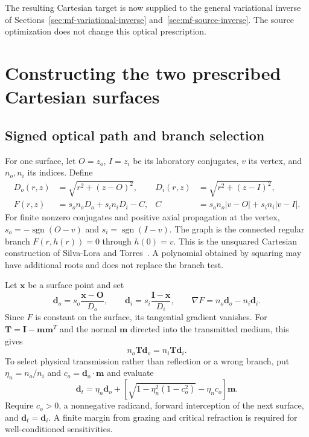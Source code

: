 The resulting Cartesian target is now supplied to the general variational
inverse of Sections~\ref{sec:mf-variational-inverse} and~\ref{sec:mf-source-inverse}.
The source optimization does not change this optical prescription.

\section{Constructing the two prescribed Cartesian surfaces}
\subsection{Signed optical path and branch selection}
For one surface, let $O=z_o$, $I=z_i$ be its laboratory conjugates, $v$ its
vertex, and $n_o,n_i$ its indices. Define
\begin{align}
 D_o(r,z)&=\sqrt{r^2+(z-O)^2},&D_i(r,z)&=\sqrt{r^2+(z-I)^2},\label{eq:distances}\\
 F(r,z)&=s_on_oD_o+s_in_iD_i-C,&
 C&=s_on_o|v-O|+s_in_i|v-I|.\label{eq:oval}
\end{align}
For finite nonzero conjugates and positive axial propagation at the vertex,
$s_o=-\operatorname{sgn}(O-v)$ and $s_i=\operatorname{sgn}(I-v)$.
The graph is the connected regular branch $F(r,h(r))=0$ through $h(0)=v$.
This is the unsquared Cartesian construction of Silva-Lora and
Torres~\cite{silva2020}. A polynomial obtained by squaring may have additional
roots and does not replace the branch test.

Let $\mathbf x$ be a surface point and set
\begin{equation}
 \mathbf d_o=s_o\frac{\mathbf x-\mathbf O}{D_o},\qquad
 \mathbf d_i=s_i\frac{\mathbf I-\mathbf x}{D_i},\qquad
 \nabla F=n_o\mathbf d_o-n_i\mathbf d_i.\label{eq:snell-gradient}
\end{equation}
Since $F$ is constant on the surface, its tangential gradient vanishes.
For $\mathbf T=\mathbf I-\mathbf m\mathbf m^T$ and the normal $\mathbf m$
directed into the transmitted medium, this gives
\begin{equation}
 n_o\mathbf T\mathbf d_o=n_i\mathbf T\mathbf d_i.\label{eq:snell-tangent}
\end{equation}
To select physical transmission rather than reflection or a wrong branch,
put $\eta_n=n_o/n_i$ and $c_o=\mathbf d_o\cdot\mathbf m$ and evaluate
\begin{equation}\label{eq:snell-full}
 \mathbf d_t=\eta_n\mathbf d_o+
 \left[\sqrt{1-\eta_n^2(1-c_o^2)}-\eta_nc_o\right]\mathbf m.
\end{equation}
Require $c_o>0$, a nonnegative radicand, forward interception of the next
surface, and $\mathbf d_t=\mathbf d_i$. A finite margin from grazing and
critical refraction is required for well-conditioned sensitivities.


